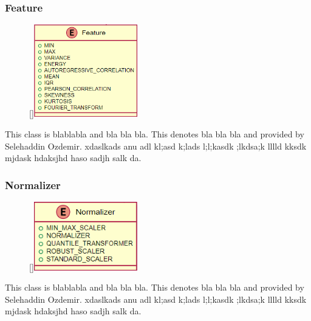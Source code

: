 \subsubsection{Feature}
\begin{figure}
    \raisebox{0pt}[\dimexpr{}\baselineskip\relax]{\includegraphics[width=4.5cm]{classes/model-management/6.png}}
\end{figure} 
\par
This class is blablabla and bla bla bla. This denotes bla bla bla and provided by Selehaddin Ozdemir. xdaslkads anu adl kl;asd k;lads l;l;kasdk ;lkdsa;k lllld kksdk mjdask hdaksjhd haso sadjh salk da.
\newline
\newline
\newline
\newline

\subsubsection{Normalizer}
\begin{figure}
    \raisebox{0pt}[\dimexpr{}\baselineskip\relax]{\includegraphics[width=4.5cm]{classes/model-management/7.png}}
\end{figure} 
\par
This class is blablabla and bla bla bla. This denotes bla bla bla and provided by Selehaddin Ozdemir. xdaslkads anu adl kl;asd k;lads l;l;kasdk ;lkdsa;k lllld kksdk mjdask hdaksjhd haso sadjh salk da.
\newline
\newline

